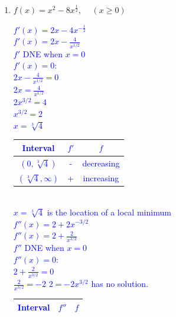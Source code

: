 \documentclass{ximera}
\begin{document}
\begin{exercise}
\begin{enumerate}
{\begin{image}
    \end{image}
    }
    \textcolor{orange}{Student can absolutely use a number line for the sign diagram - they are just hard to replicate in type!}
    \item $f(x)=x^2-8x^{\frac{1}{2}},\,\,\,\,\,\,\, (x\geq 0)$\\
    \textcolor{blue}{$f'(x)=2x-4x^{-\frac12}$\\
    $f'(x)=2x-\frac{4}{x^{1/2}}$\\
    $f'$ DNE when $x=0$\\
    $f'(x)=0$:\\
    $2x-\frac4{x^{1/2}}=0$\\
    $2x=\frac4{x^{1/2}}$\\
    $2x^{3/2}=4$\\
    $x^{3/2}=2$\\
    $x=\sqrt[3]{4}$\\
    \begin{tabular}{c|c|c}
       Interval  & $f'$ & $f$  \\ \hline
     $(0,\sqrt[3]{4})$ & - & decreasing \\
     $(\sqrt[3]{4},\infty)$ & + & increasing\\
    \end{tabular}\\
    $x=\sqrt[3]{4}$ is the location of a local minimum\\
    $f''(x)=2+2x^{-3/2}$\\
    $f''(x)=2+\frac{2}{x^{3/2}}$\\
    $f''$ DNE when $x=0$\\
    $f''(x)=0$:\\
    $2+\frac{2}{x^{3/2}}=0$\\
    $\frac{2}{x^{3/2}}=-2$
    $2=-2x^{3/2}$ has no solution.\\
    \begin{tabular}{c|c|c}
        Interval & $f''$ & $f$  \\ \hline

\end{tabular}}
\end{enumerate}
\end{exercise}
\end{document}
